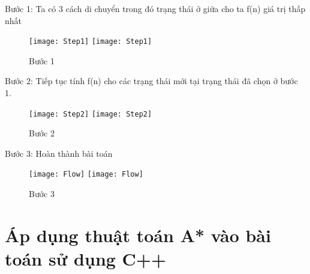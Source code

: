 Bước 1: Ta có 3 cách di chuyển trong đó trạng thái ở giữa cho ta f(n) giá trị thấp nhất 

\begin{figure}[!htbp]
  \begin{center}
    \leavevmode
    \ifpdf
      \texttt{[image: Step1]}
    \else
      \texttt{[image: Step1]}
    \fi
    \caption{Bước 1}
    \label{FigAir}
   
  \end{center}
\end{figure}
\FloatBarrier

Bước 2: Tiếp tục tính f(n) cho các trạng thái mới tại trạng thái đã chọn ở bước 1.	 

\begin{figure}[!htbp]
  \begin{center}
    \leavevmode
    \ifpdf
      \texttt{[image: Step2]}
    \else
      \texttt{[image: Step2]}
    \fi
    \caption{Bước 2}
    \label{FigAir}
   
  \end{center}
\end{figure}
\FloatBarrier

Bước 3: Hoàn thành bài toán
\begin{figure}[!htbp]
  \begin{center}
    \leavevmode
    \ifpdf
      \texttt{[image: Flow]}
    \else
      \texttt{[image: Flow]}
    \fi
    \caption{Bước 3}
    \label{FigAir}
   
  \end{center}
\end{figure}
\FloatBarrier



\section{Áp dụng thuật toán A* vào bài toán sử dụng C++}
